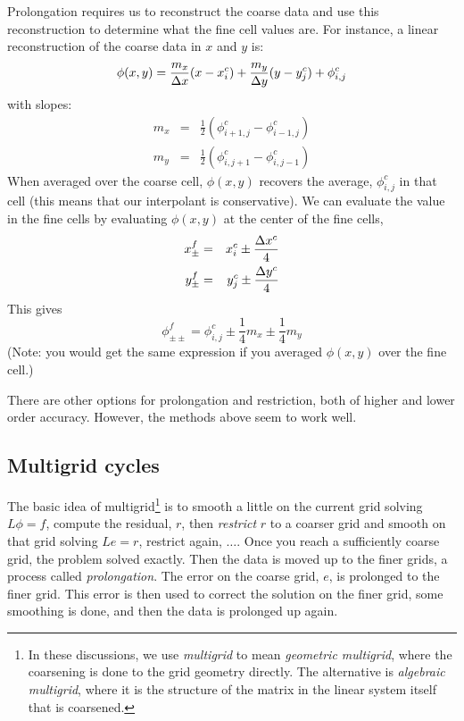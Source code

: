 Prolongation requires us to reconstruct the coarse data and use
this reconstruction to determine what the fine cell values are.  For
instance, a linear reconstruction of the coarse data in $x$ and $y$ is:
\begin{equation}
\phi(x,y) = \frac{m_x}{\Delta x} (x - x_i^c) + 
            \frac{m_y}{\Delta y} (y - y_j^c) + \phi_{i,j}^c
\end{equation}
with slopes:
\begin{eqnarray}
m_x &=& \frac{1}{2}({\phi_{i+1,j}^c - \phi_{i-1,j}^c}) \\
m_y &=& \frac{1}{2}({\phi_{i,j+1}^c - \phi_{i,j-1}^c})
\end{eqnarray}
%
When averaged over the coarse cell, $\phi(x,y)$ recovers the average,
$\phi_{i,j}^c$ in that cell (this means that our interpolant is
conservative).  We can evaluate the value in the fine cells by
evaluating $\phi(x,y)$ at the center of the fine cells,
\begin{eqnarray}
x_\pm^f &=& x_i^c \pm \frac{\Delta x^c}{4} \\
y_\pm^f &=& y_j^c \pm \frac{\Delta y^c}{4} \\
\end{eqnarray}
This gives
\begin{equation}
\phi_{\pm\pm}^f = \phi_{i,j}^c \pm \frac{1}{4}m_x \pm \frac{1}{4}m_y
\end{equation}
(Note: you would get the same expression if you averaged $\phi(x,y)$ over
the fine cell.)

There are other options for prolongation and restriction, both of
higher and lower order accuracy.  However, the methods above seem to
work well.


\subsection{Multigrid cycles}

The basic idea of
multigrid\footnote{ In these discussions, we use {\em multigrid} to
  mean {\em geometric multigrid}, where the coarsening is done to the
  grid geometry directly.  The alternative is {\em algebraic
    multigrid}, where it is the structure of the matrix in the linear
  system itself that is coarsened.}  is to smooth a little on the
current grid solving $L\phi = f$, compute the residual, $r$, then {\em
  restrict} $r$ to a coarser grid and smooth on that grid solving $Le
= r$, restrict again, $\ldots$.  Once you reach a sufficiently coarse
grid, the problem solved exactly.  Then the data is moved up to the
finer grids, a process called {\em prolongation}.  The error on the
coarse grid, $e$, is prolonged to the finer grid.  This error is then
used to correct the solution on the finer grid, some smoothing is
done, and then the data is prolonged up again.

